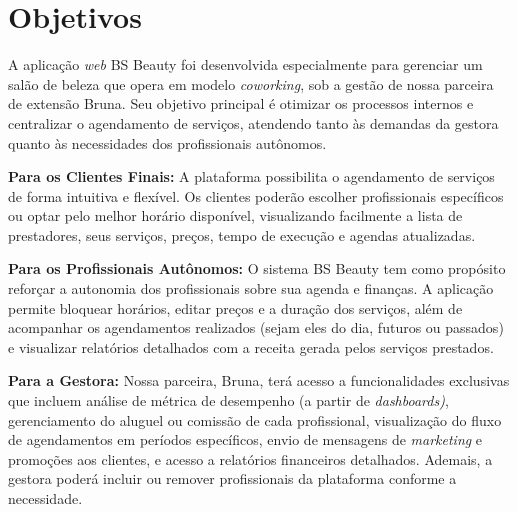 \section{Objetivos}

A aplicação \emph{web} BS Beauty foi desenvolvida especialmente para gerenciar um salão de beleza que opera em modelo \emph{coworking}, sob a gestão de nossa parceira de extensão Bruna. Seu objetivo principal é otimizar os processos internos e centralizar o agendamento de serviços, atendendo tanto às demandas da gestora quanto às necessidades dos profissionais autônomos.

\noindent\textbf{Para os Clientes Finais:} A plataforma possibilita o agendamento de serviços de forma intuitiva e flexível. Os clientes poderão escolher profissionais específicos ou optar pelo melhor horário disponível, visualizando facilmente a lista de prestadores, seus serviços, preços, tempo de execução e agendas atualizadas.

\noindent\textbf{Para os Profissionais Autônomos:} O sistema BS Beauty tem como propósito reforçar a autonomia dos profissionais sobre sua agenda e finanças. A aplicação permite bloquear horários, editar preços e a duração dos serviços, além de acompanhar os agendamentos realizados (sejam eles do dia, futuros ou passados) e visualizar relatórios detalhados com a receita gerada pelos serviços prestados.

\noindent\textbf{Para a Gestora:} Nossa parceira, Bruna, terá acesso a funcionalidades exclusivas que incluem análise de métrica de desempenho (a partir de \emph{dashboards)}, gerenciamento do aluguel ou comissão de cada profissional, visualização do fluxo de agendamentos em períodos específicos, envio de mensagens de \emph{marketing} e promoções aos clientes, e acesso a relatórios financeiros detalhados. Ademais, a gestora poderá incluir ou remover profissionais da plataforma conforme a necessidade.